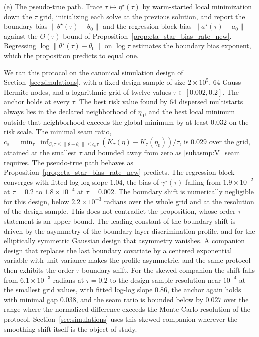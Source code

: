 \documentclass[11pt]{article}
\theoremstyle{definition}
\theoremstyle{plain}
\begin{document}
(e) The pseudo-true path. Trace $\tau\mapsto\eta^\star(\tau)$ by warm-started local minimization down the $\tau$ grid, initializing each solve at the previous solution, and report the boundary bias $\|\theta^\star(\tau)-\theta_0\|$ and the regression-block bias $\|a^\star(\tau)-a_0\|$ against the $O(\tau)$ bound of Proposition~\ref{prop:eta_star_bias_rate_new}. Regressing $\log\|\theta^\star(\tau)-\theta_0\|$ on $\log\tau$ estimates the boundary bias exponent, which the proposition predicts to equal one.

We ran this protocol on the canonical simulation design of Section~\ref{sec:simulations}, with a fixed design sample of size $2\times10^{5}$, $64$ Gauss--Hermite nodes, and a logarithmic grid of twelve values $\tau\in[0.002,0.2]$. The anchor holds at every $\tau$. The best risk value found by $64$ dispersed multistarts always lies in the declared neighborhood of $\eta_0$, and the best local minimum outside that neighborhood exceeds the global minimum by at least $0.032$ on the risk scale. The minimal seam ratio, $c_s=\min_\tau\ \inf_{C_1\tau\le\|\theta-\theta_0\|\le c_0\tau}(K_\tau(\eta)-K_\tau(\eta_0))/\tau$, is $0.029$ over the grid, attained at the smallest $\tau$ and bounded away from zero as \ref{subasmp:V_seam} requires. The pseudo-true path behaves as Proposition~\ref{prop:eta_star_bias_rate_new} predicts. The regression block converges with fitted log-log slope $1.04$, the bias of $\gamma^\star(\tau)$ falling from $1.9\times10^{-2}$ at $\tau=0.2$ to $1.8\times10^{-4}$ at $\tau=0.002$. The boundary shift is numerically negligible for this design, below $2.2\times10^{-3}$ radians over the whole grid and at the resolution of the design sample. This does not contradict the proposition, whose order $\tau$ statement is an upper bound. The leading constant of the boundary shift is driven by the asymmetry of the boundary-layer discrimination profile, and for the elliptically symmetric Gaussian design that asymmetry vanishes. A companion design that replaces the last boundary covariate by a centered exponential variable with unit variance makes the profile asymmetric, and the same protocol then exhibits the order $\tau$ boundary shift. For the skewed companion the shift falls from $6.1\times10^{-3}$ radians at $\tau=0.2$ to the design-sample resolution near $10^{-4}$ at the smallest grid values, with fitted log-log slope $0.86$, the anchor again holds with minimal gap $0.038$, and the seam ratio is bounded below by $0.027$ over the range where the normalized difference exceeds the Monte Carlo resolution of the protocol. Section~\ref{sec:simulations} uses this skewed companion wherever the smoothing shift itself is the object of study.
\end{document}
